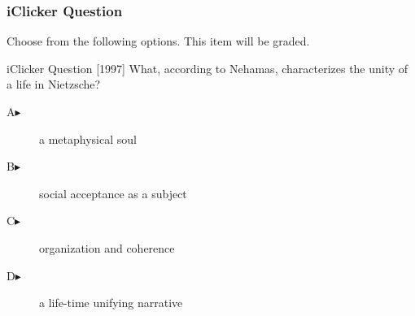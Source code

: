 \begin{frame}
  \frametitle{iClicker Question}
Choose from the following options. This item will be graded.
\begin{block}{iClicker Question}
[1997] What, according to Nehamas, characterizes the unity of a life
in Nietzsche?
\end{block}
\begin{description}
\item[A\hspace{.2in}$\blacktriangleright$] a metaphysical soul
\item[B\hspace{.2in}$\blacktriangleright$] social acceptance as a subject
\item[C\hspace{.2in}$\blacktriangleright$] organization and coherence
\item[D\hspace{.2in}$\blacktriangleright$] a life-time unifying narrative
\end{description}
\end{frame}
